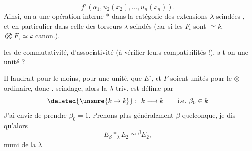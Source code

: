 \[
f^\circ(\alpha_1,u_2(x_2),\ldots,u_n(x_n)).
\]
Ainsi, on a une opération interne $*$ dans la catégorie des extensions $\lambda$-scindées , et en particulier dans celle des torseurs $\lambda$-scindés (car si les $F_i$ sont $\simeq k$, $\bigotimes F_i\simeq k$ canon.).

 les  de commutativité, d'associativité (à vérifier leurs compatibilités !), a-t-on une unité ?

Il faudrait pour le moins,  pour une unité,
que $E^\circ$, et $F$ soient unités pour le $\otimes$ ordinaire, donc  .
  scindage, alors la $\lambda$-triv. est définie par
\[
\deleted{\unsure{k\to k}}:\ k\longrightarrow k\qquad\text{i.e. }\beta_0\in k
\]
J'ai envie de prendre $\beta_0=1$. Prenons plus généralement $\beta$ quelconque, je dis qu'alors
\[
E_\beta\mathbin{*}_{\lambda}E_2\simeq {}^\beta E_2,
\]
muni de la $\lambda$ 
